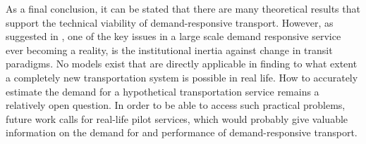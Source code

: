 \documentclass[dissertation,draft*]{aaltoseries}
\begin{document}
% 

As a final conclusion, it can be stated that there are many theoretical results
that support the technical viability of demand-responsive transport.
However, as suggested in \cite{cortes}, one of the key issues in a large scale demand 
responsive service ever becoming a reality, is the
institutional inertia against change in transit paradigms. No models exist that are
directly applicable in finding to what extent a completely new transportation system is possible in real life.
How to accurately estimate the demand for a hypothetical transportation service remains a relatively open question.
In order to be able to access such practical problems, future work calls for 
real-life pilot services, which would probably give valuable information on the 
demand for and performance of demand-responsive transport.
\end{document}
